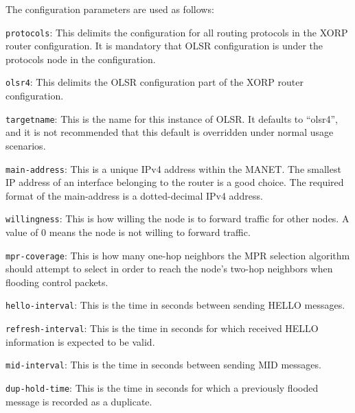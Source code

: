 The configuration parameters are used as follows:
\begin{description}
\item{\tt protocols}: This delimits the configuration for all routing
  protocols in the XORP router configuration.  It is mandatory that
  OLSR configuration is under the {\stt protocols} node in the
  configuration.
\item{\tt olsr4}: This delimits the OLSR configuration part of the XORP
  router configuration.
\item{\tt targetname}: This is the name for this instance of OLSR.  It
  defaults to ``{\stt olsr4}'', and it is not recommended that this
  default is overridden under normal usage scenarios.
\item{\tt main-address}: This is a unique IPv4 address within the
MANET. The smallest IP address of an interface belonging
to the router is a good choice. The required format of the {\stt
main-address} is a dotted-decimal IPv4 address.
\item{\tt willingness}: This is how willing the node is to forward
traffic for other nodes. A value of 0 means the node is not willing
to forward traffic.
\item{\tt mpr-coverage}: This is how many one-hop neighbors the MPR
selection algorithm should attempt to select in order to reach the
node's two-hop neighbors when flooding control packets.
\item{\tt hello-interval}: This is the time in seconds between sending
HELLO messages.
\item{\tt refresh-interval}: This is the time in seconds for which
received HELLO information is expected to be valid.
\item{\tt mid-interval}: This is the time in seconds between sending
MID messages.
\item{\tt dup-hold-time}: This is the time in seconds for which
a previously flooded message is recorded as a duplicate.


\end{description}

